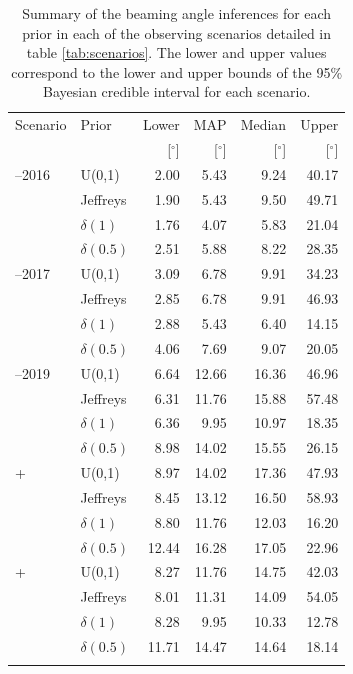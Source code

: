 \documentclass[twocolumn]{aastex61}
\begin{document}
\begin{table}
\centering
\begin{tabular}{llrrrr}
  \toprule
  Scenario & Prior & Lower & MAP & Median & Upper \\
  && [$^{\circ}$] & [$^{\circ}$]    & [$^{\circ}$]    & [$^{\circ}$]  \\
  \colrule
  2015--2016 & U(0,1) 	 & 2.00	 & 5.43	& 9.24	& 40.17	 \\
& Jeffreys 	 & 1.90	 & 5.43	& 9.50	& 49.71	 \\
& $\delta(1)$ 	 & 1.76	 & 4.07	& 5.83	& 21.04	 \\
& $\delta(0.5)$ 	 & 2.51	 & 5.88	& 8.22	& 28.35	 \\
  \colrule
  2016--2017 & U(0,1) 	 & 3.09	 & 6.78	& 9.91	& 34.23	 \\
& Jeffreys 	 & 2.85	 & 6.78	& 9.91	& 46.93	 \\
& $\delta(1)$ 	 & 2.88	 & 5.43	& 6.40	& 14.15	 \\
& $\delta(0.5)$ 	 & 4.06	 & 7.69	& 9.07	& 20.05	 \\
  \colrule
  2018--2019 & U(0,1) 	 & 6.64	 & 12.66	& 16.36	& 46.96	 \\
& Jeffreys 	 & 6.31	 & 11.76	& 15.88	& 57.48	 \\
& $\delta(1)$ 	 & 6.36	 & 9.95	& 10.97	& 18.35	 \\
& $\delta(0.5)$ 	 & 8.98	 & 14.02	& 15.55	& 26.15	 \\
  \colrule
  2020+    
& U(0,1) 	 & 8.97	 & 14.02	& 17.36	& 47.93	 \\
& Jeffreys 	 & 8.45	 & 13.12	& 16.50	& 58.93	 \\
& $\delta(1)$ 	 & 8.80	 & 11.76	& 12.03	& 16.20	 \\
& $\delta(0.5)$ 	 & 12.44	 & 16.28	& 17.05	& 22.96	 \\
  \colrule
  2024+    
& U(0,1) 	 & 8.27	 & 11.76	& 14.75	& 42.03	 \\
& Jeffreys 	 & 8.01	 & 11.31	& 14.09	& 54.05	 \\
& $\delta(1)$ 	 & 8.28	 & 9.95	& 10.33	& 12.78	 \\
& $\delta(0.5)$ 	 & 11.71	 & 14.47	& 14.64	& 18.14	 \\
\botrule
\end{tabular}
\caption{Summary of the beaming angle inferences for each prior in each of the observing scenarios detailed in table \ref{tab:scenarios}.
    The lower and upper values correspond to the lower and upper bounds of the 95\% Bayesian credible interval for each scenario.
    \label{tab:aligo_beam_inference}}
\end{table}
\end{document}
